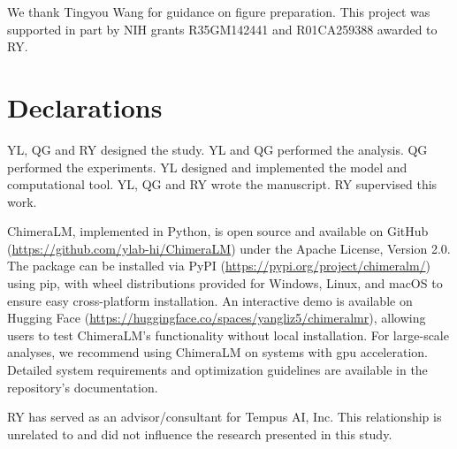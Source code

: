 \documentclass[pdflatex,sn-nature]{sn-jnl}%
\theoremstyle{thmstyleone}%
\theoremstyle{thmstyletwo}%
\theoremstyle{thmstylethree}%
\begin{document}

We thank Tingyou Wang for guidance on figure preparation.
This project was supported in part by NIH grants R35GM142441 and R01CA259388 awarded to RY.

\section*{Declarations}


YL, QG and RY designed the study.
YL and QG performed the analysis.
QG performed the experiments.
YL designed and implemented the model and computational tool.
YL, QG and RY wrote the manuscript.
RY supervised this work.



ChimeraLM, implemented in Python, is open source and available on GitHub (\url{https://github.com/ylab-hi/ChimeraLM}) under the Apache License, Version 2.0.
The package can be installed via PyPI (\url{https://pypi.org/project/chimeralm/}) using pip, with wheel distributions provided for Windows, Linux, and macOS to ensure easy cross-platform installation.
An interactive demo is available on Hugging Face (\url{https://huggingface.co/spaces/yangliz5/chimeralmr}), allowing users to test ChimeraLM's functionality without local installation.
For large-scale analyses, we recommend using ChimeraLM on systems with \gls{gpu} acceleration. Detailed system requirements and optimization guidelines are available in the repository's documentation.


RY has served as an advisor/consultant for Tempus AI, Inc. This relationship is unrelated to and did not influence the research presented in this study.


%
\end{document}
